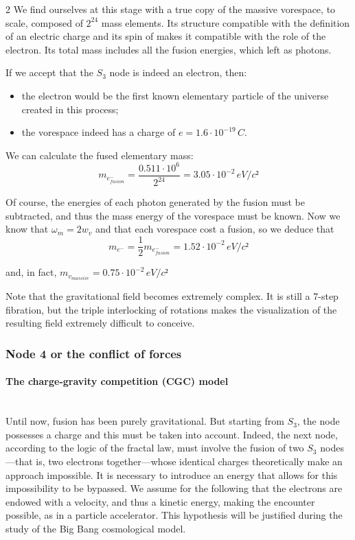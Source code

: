 \begin{multicols}{2}
	We find ourselves at this stage with a true copy of the massive 
	vorespace, to scale, composed of $2^{24}$ mass elements. Its structure 
	compatible with the definition of an electric charge and its spin of 
	 makes it compatible with the role of the electron. Its total mass 
	includes all the fusion energies, which left as photons.
	
	If we accept that the $S_3$ node is indeed an electron, then:
	
	\begin{itemize}
		\item the electron would be the first known elementary particle of the 
		universe created in this process;
		\item the vorespace indeed has a charge of $e=1.6 \cdot 10^{-19}\,C$.
	\end{itemize}
	
	We can calculate the fused elementary mass:
	\begin{equation*}
		m_{e^-_{fusion}} = \frac {0.511 \cdot 10^6} {2^{24}} = 3.05 \cdot 10^{-2}\,eV/c²
	\end{equation*}
	
	Of course, the energies of each photon generated by the fusion must be 
	subtracted, and thus the mass energy of the vorespace must be known. Now 
	we know that $\omega_m = 2 w_v$ and that each vorespace cost a fusion, 
	so we deduce that
	\begin{equation*}
		m_{e^-} = \frac{1}{2} m_{e^-_{fusion}} = 1.52 \cdot 10^{-2}\,eV/c²
	\end{equation*}
	
	and, in fact, $m_{v_{massive}} = 0.75 \cdot 10^{-2}\,eV/c²$
	\medskip
	
	Note that the gravitational field becomes extremely complex. It is still 
	a 7-step fibration, but the triple interlocking of rotations makes the 
	visualization of the resulting field extremely difficult to conceive.
	
	
	\subsubsection{Node 4 or the conflict of forces}
	
	\paragraph{The charge-gravity competition (CGC) model}~\\
	
	Until now, fusion has been purely gravitational. But starting from $S_3$, the node possesses a charge and this must be taken into account. Indeed, the next node, according to the logic of the fractal law, must involve the fusion of two $S_3$ nodes—that is, two electrons together—whose identical charges theoretically make an approach impossible. It is necessary to introduce an energy that allows for this impossibility to be bypassed. We assume for the following that the electrons are endowed with a velocity, and thus a kinetic energy, making the encounter possible, as in a particle accelerator. This hypothesis will be justified during the study of the Big Bang cosmological model.
	

\end{multicols}
